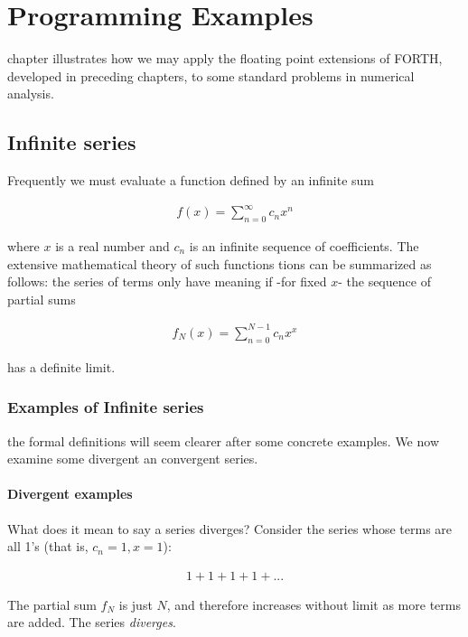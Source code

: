 
\chapter{Programming Examples}

 chapter illustrates how we may apply the floating point extensions of FORTH, developed in preceding chapters, to some standard problems in numerical analysis.

\section{Infinite series}

Frequently we must evaluate a function defined by an infinite sum

\begin{align}
    f(x) = \sum_{n=0}^{\infty}c_{n}x^{n}
    \label{eq:06_01}
\end{align}

where $x$ is a real number and $c_n$ is an infinite sequence of coefficients. The extensive mathematical theory of such functions tions can be summarized as follows: the series of terms only have meaning if -for fixed $x$- the sequence of partial sums

\begin{align}
    f_{N}(x) = \sum_{n=0}^{N-1}c_{n}x^{x}
\end{align}

has a definite limit.

\subsection{Examples of Infinite series}
 the formal definitions will seem clearer after some concrete examples. We now examine some divergent an convergent series.

\subsubsection{Divergent examples}
What does it mean to say a series diverges? Consider the series whose terms are all 1's (that is, $c_n = 1, x = 1$):

\begin{align}
    1 + 1 + 1 + 1 + ...
\end{align}

The partial sum $f_N$ is just $N$, and therefore increases without limit as more terms are added. The series \textit{diverges}.

